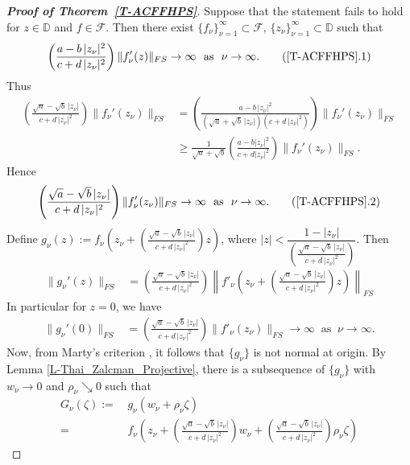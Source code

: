 \documentclass[11pt, reqno]{amsart}
\theoremstyle{definition}
\theoremstyle{remark}
\numberwithin{equation}{section}
\begin{document}
\begin{proof}[{\bf Proof of Theorem~\ref{T-ACFFHPS}}]
Suppose that the statement fails to hold for $z\in \mathbb D$ and $f\in\mathcal F$. Then there exist $\{f_{\nu}\}_{\nu=1}^\infty\subset \mathcal F$, $\{z_{\nu}\}_{\nu=1}^\infty\subset\mathbb D$ such that 
\begin{align*}
    \left(\frac{a-b\,|z_{\nu}|^2}{c+d\,|z_{\nu}|^2}\right)\|f_{\nu}'(z)\|_{FS}\to\infty\ \text{ as }\ \nu\to\infty.\label{ACFFHPS.1} \tag{\ref*{T-ACFFHPS}.1}
\end{align*}
Thus \begin{align*}
    \left(\frac{\sqrt{a}-\sqrt{b}\,|z_{\nu}|}{c+d\,|z_{\nu}|^2}\right)\|f_{\nu}'(z_{\nu})\|_{FS}&=\left(\frac{a-b\,|z_{\nu}|^2}{(\sqrt{a}+\sqrt{b}\,|z_{\nu}|)(c+d\,|z_{\nu}|^2)}\right)\|f_{\nu}'(z_{\nu})\|_{FS}\\
    &\geq \frac{1}{\sqrt{a}+\sqrt{b}}\left(\frac{a-b|z_{\nu}|^2}{c+d|z_{\nu}|^2}\right)\|f_{\nu}'(z_{\nu})\|_{FS}.
\end{align*}
Hence \begin{align*}
\left(\frac{\sqrt{a}-\sqrt{b}\,|z_{\nu}|}{c+d\,|z_{\nu}|^2}\right)\|f_{\nu}'(z_{\nu})\|_{FS}\to\infty\ \text{ as }\ \nu\to\infty. \label{ACFFHPS.2} \tag{\ref*{T-ACFFHPS}.2} \end{align*}
Define $g_{\nu}(z):=f_{\nu}\left(z_{\nu}+\left(\frac{\sqrt{a}-\sqrt{b}\,|z_{\nu}|}{c+d\,|z_{\nu}|^2}\right)z\right)$, where $|z|<\dfrac{1-|z_{\nu}|}{\left(\frac{\sqrt{a}-\sqrt{b}\,|z_{\nu}|}{c+d\,|z_{\nu}|^2}\right)}$.
Then \begin{align*} \|g_{\nu}'(z)\|_{FS}&=\left(\frac{\sqrt{a}-\sqrt{b}\,|z_{\nu}|}{c+d\,|z_{\nu}|^2}\right)\left\|f'_{\nu}\left(z_{\nu}+\left(\frac{\sqrt{a}-\sqrt{b}\,|z_{\nu}|}{c+d\,|z_{\nu}|^2}\right)z\right)\right\|_{FS} 
\end{align*}
    In particular for $z=0$, we have
    \begin{align*}
    \|g_{\nu}'(0)\|_{FS}&= \left(\frac{\sqrt{a}-\sqrt{b}\,|z_{\nu}|}{c+d\,|z_{\nu}|^2}\right)\|f'_{\nu}(z_{\nu})\|_{FS} \to\infty\ \text{ as }\ \nu\to\infty.
\end{align*}
Now, from Marty's criterion \cite[p. 4]{ere-nhcfprtps-2007}, it follows that $\{g_{\nu}\}$ is not normal at origin. By Lemma 
\ref{L-Thai_Zalcman_Projective}, there is a subsequence of $\{g_{\nu}\}$ with $w_{\nu}\to 0$ and $\rho_{\nu}\searrow 0$
such that
\begin{align*}
    G_{\nu}(\zeta):=&\, g_{\nu}(w_{\nu}+\rho_{\nu}\zeta)\\
    =&\,f_{\nu}\left(z_{\nu}+\left(\frac{\sqrt{a}-\sqrt{b}\,|z_{\nu}|}{c+d\,|z_{\nu}|^2}\right)w_{\nu}+\left(\frac{\sqrt{a}-\sqrt{b}\,|z_{\nu}|}{c+d\,|z_{\nu}|^2}\right)\rho_{\nu}\zeta\right)

\end{align*}
\end{proof}
\end{document}
